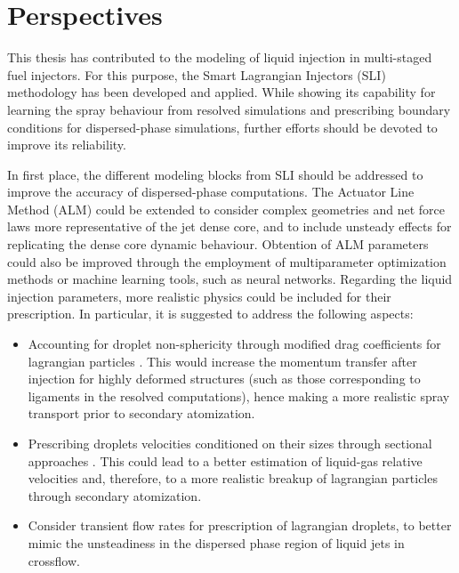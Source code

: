 \section*{Perspectives}

This thesis has contributed to the modeling of liquid injection in multi-staged fuel injectors. For this purpose, the Smart Lagrangian Injectors (SLI) methodology has been developed and applied. While showing its capability for learning the spray behaviour from resolved simulations and prescribing boundary conditions for dispersed-phase simulations, further efforts should be devoted to improve its reliability. 

In first place, the different modeling blocks from SLI should be addressed to improve the accuracy of dispersed-phase computations. The Actuator Line Method (ALM) could be extended to consider complex geometries and net force laws more representative of the jet dense core, and to include unsteady effects for replicating the dense core dynamic behaviour. Obtention of ALM parameters could also be improved through the employment of multiparameter optimization methods or machine learning tools, such as neural networks. Regarding the liquid injection parameters, more realistic physics could be included for their prescription. In particular, it is suggested to address the following aspects:

\begin{itemize}
	
		\item Accounting for droplet non-sphericity through modified drag coefficients for lagrangian particles . This would increase the momentum transfer after injection for highly deformed structures (such as those corresponding to ligaments in the resolved computations), hence making a more realistic spray transport prior to secondary atomization. 
		
		\item Prescribing droplets velocities conditioned on their sizes through sectional approaches . This could lead to a better estimation of liquid-gas relative velocities and, therefore, to a more realistic breakup of lagrangian particles through secondary atomization.
		
		\item Consider transient flow rates for prescription of lagrangian droplets, to better mimic the unsteadiness in the dispersed phase region of liquid jets in crossflow.
	
\end{itemize}


